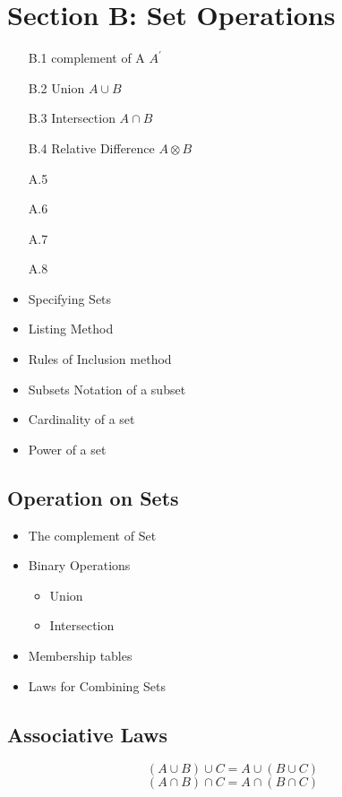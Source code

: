 \documentclass[]{report}
\begin{document}
\newpage
\section*{Section B: Set Operations}
\begin{itemize}
\item[B.1] complement of A $A^{\prime}$
\item[B.2] Union $A \cup B$
\item[B.3] Intersection $A \cap B$
\item[B.4] Relative Difference $A \otimes B$
\item[A.5]
\item[A.6]
\item[A.7]
\item[A.8]
\end{itemize}
\newpage


\begin{itemize}
\item Specifying Sets
\item Listing Method
\item Rules of Inclusion method
\end{itemize}


\begin{itemize}
\item Subsets Notation of a subset
\item Cardinality of a set
\item Power of a set
\end{itemize}

\subsection*{Operation on Sets}

\begin{itemize}
\item The complement of Set
\item Binary Operations
\begin{itemize}
\item Union
\item Intersection
\end{itemize}
\item Membership tables
\item Laws for Combining Sets
\end{itemize}

\newpage


\subsection*{Associative Laws}
\[ (A \cup B) \cup C =  A \cup (B \cup C)  \]
\[ (A \cap B) \cap C =  A \cap (B \cap C)  \]
\end{document}
